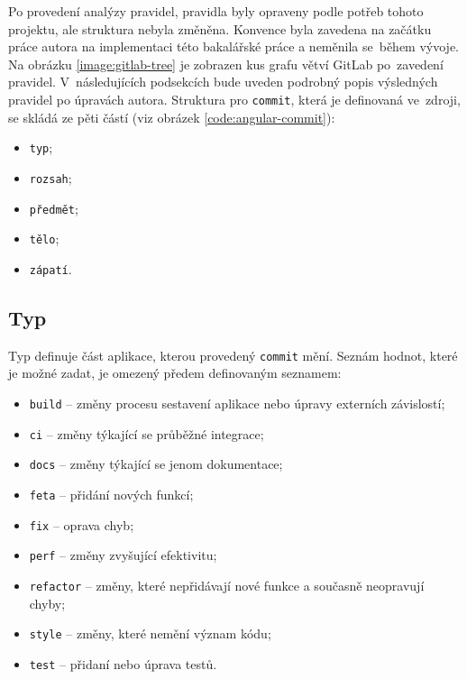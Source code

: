     Po provedení analýzy pravidel, pravidla byly opraveny podle potřeb tohoto projektu, ale struktura nebyla změněna. Konvence byla zavedena na začátku práce autora na implementaci této bakalářské práce a neměnila se~během vývoje. Na obrázku \ref{image:gitlab-tree} je zobrazen kus grafu větví GitLab po~zavedení pravidel. V~následujících podsekcích bude uveden podrobný popis výsledných pravidel po úpravách autora. Struktura pro \verb|commit|, která je definovaná ve~zdroji, se skládá ze pěti částí (viz obrázek \ref{code:angular-commit}):
    \begin{itemize}
    \setlength\itemsep{0.3em}
        \item \texttt{typ};
        \item \texttt{rozsah};
        \item \texttt{předmět};
        \item \texttt{tělo};
        \item \texttt{zápatí}.
    \end{itemize}
    
    \subsection{Typ}
        Typ definuje část aplikace, kterou provedený \verb|commit| mění. Seznám hodnot, které je možné zadat, je omezený předem definovaným seznamem:
        \begin{itemize}
        \setlength\itemsep{0.3em}
            \item \texttt{build} -- změny procesu sestavení aplikace nebo úpravy externích závislostí;
            \item \texttt{ci} -- změny týkající se průběžné integrace;
            \item \texttt{docs} -- změny týkající se jenom dokumentace;
            \item \texttt{feta} -- přidání nových funkcí;
            \item \texttt{fix} -- oprava chyb;
            \item \texttt{perf} -- změny zvyšující efektivitu;
            \item \texttt{refactor} -- změny, které nepřidávají nové funkce a současně neopravují chyby;
            \item \texttt{style} -- změny, které nemění význam kódu;
            \item \texttt{test} -- přidaní nebo úprava testů.
        \end{itemize}
    
